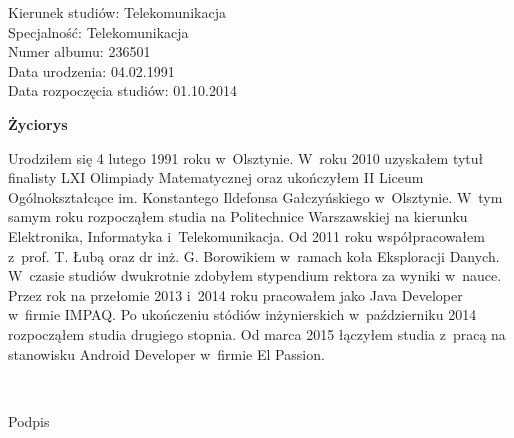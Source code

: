 	\newpage
	\thispagestyle{empty}

\begin{flushright}

  \begin{varwidth}[t]{\textwidth}
	Kierunek studiów: Telekomunikacja\\
	Specjalność: Telekomunikacja \\
	Numer albumu: 236501\\
	Data urodzenia: 04.02.1991 \\
	Data rozpoczęcia studiów: 01.10.2014 \\
  \end{varwidth}

\end{flushright}

\begin{center}
    \textbf{\textbf{Życiorys}}
\end{center}

	\vspace{0.5cm}

Urodziłem się 4 lutego 1991 roku w~Olsztynie.
W~roku 2010 uzyskałem tytuł finalisty LXI Olimpiady Matematycznej oraz
ukończyłem II Liceum Ogólnokształcące im. Konstantego Ildefonsa Gałczyńskiego w~Olsztynie.
W~tym samym roku rozpocząłem studia na Politechnice Warszawskiej na kierunku Elektronika, Informatyka i~Telekomunikacja.
Od 2011 roku współpracowałem z~prof. T. Łubą oraz dr inż. G. Borowikiem w~ramach koła Eksploracji Danych.
W~czasie studiów dwukrotnie zdobyłem stypendium rektora za wyniki w~nauce.
Przez rok na przełomie 2013 i~2014 roku pracowałem jako Java Developer w~firmie IMPAQ.
Po ukończeniu stódiów inżynierskich w~październiku 2014 rozpocząłem studia drugiego stopnia.
Od marca 2015 łączyłem studia z~pracą na stanowisku Android Developer w~firmie El Passion.

	\vspace{1cm}

\begin{flushright}
	\begin{minipage}{5cm}
		\dotfill \\[-0.7cm]
		\begin{center}
		\small Podpis
		\end{center}
	\end{minipage}
\end{flushright}

	\vspace{2cm}
